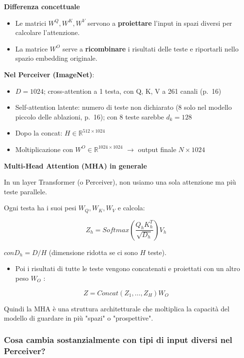 \documentclass[
  11pt,
]{article}
\begin{document}
\textbf{Differenza concettuale}
\begin{itemize}
\item Le matrici $W^Q, W^K, W^V$ servono a \textbf{proiettare} l'input in spazi diversi per calcolare l'attenzione.
\item La matrice $W^O$ serve a \textbf{ricombinare} i risultati delle teste e riportarli nello spazio embedding originale.
\end{itemize}

\textbf{Nel Perceiver (ImageNet)}:

\begin{itemize}
\item $D = 1024$; cross-attention a 1 testa, con Q, K, V a 261 canali (p.~16)
\item Self-attention latente: numero di teste non dichiarato (8 solo nel modello piccolo delle ablazioni, p.~16); con 8 teste sarebbe $d_k = 128$
\item Dopo la concat: $H \in \mathbb{R}^{512 \times 1024}$
\item Moltiplicazione con $W^O \in \mathbb{R}^{1024 \times 1024}$ $\to$ output finale $N \times 1024$
\end{itemize}

\textbf{Multi-Head Attention (MHA) in generale}

In un layer Transformer (o Perceiver), non usiamo una sola attenzione ma
più teste parallele.

Ogni testa ha i suoi pesi \(W_{Q},W_{K},W_{V}\) e calcola:

\[Z_{h} = Softmax\left( \frac{Q_{h}K_{h}^{T}}{\sqrt{D_{h}}} \right)V_{h}\]

\(conD_{h} = D/H\) (dimensione ridotta se ci sono \(H\) teste).

\begin{itemize}
\item
  Poi i risultati di tutte le teste vengono concatenati e proiettati con
  un altro peso \(W_{O}\) :
\end{itemize}

\[Z = Concat\left( Z_{1},\ldots,Z_{H} \right)W_{O}\]

Quindi la MHA è una struttura architetturale che moltiplica la capacità
del modello di guardare in più "spazi" o "prospettive".

\subsubsection{\texorpdfstring{\textbf{Cosa cambia sostanzialmente con
tipi di input diversi nel
Perceiver?}}{Cosa cambia sostanzialmente con tipi di input diversi nel Perceiver?}}\label{cosa-cambia-sostanzialmente-con-tipi-di-input-diversi-nel-perceiver}
\end{document}
